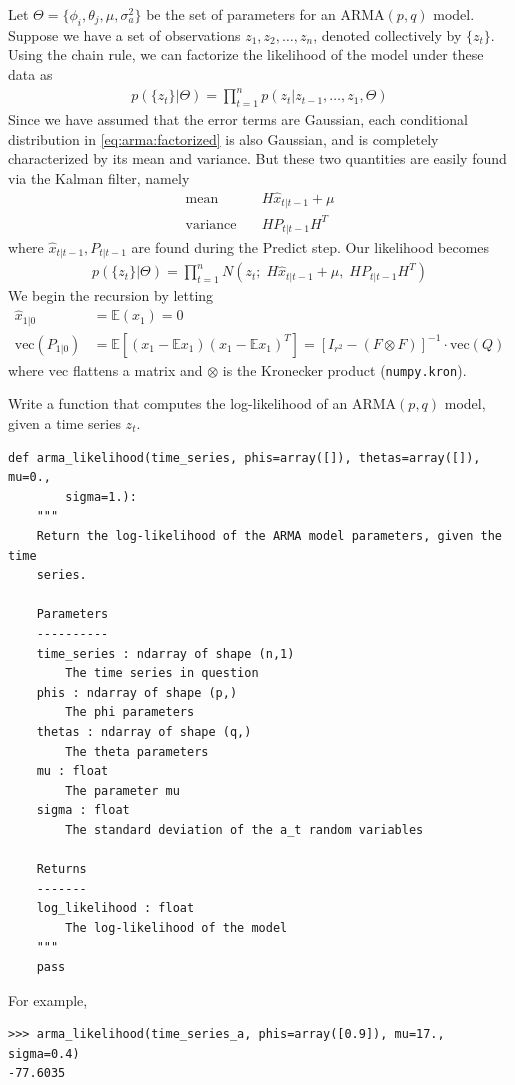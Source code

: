 Let $\Theta = \{\phi_i, \theta_j, \mu, \sigma_a^2\}$ be the set of parameters
for an $\text{ARMA}(p,q)$ model. 
Suppose we have a set of observations $z_1,z_2,\ldots,z_n$, denoted
collectively by $\{z_t\}$.
Using the chain rule, we can factorize the
likelihood of the model under these data as
\begin{align}
    \label{eq:arma:factorized}
    p(\{z_t\} | \Theta) = \prod_{t=1}^{n} p(z_t | z_{t-1}, \ldots, z_{1},
    \Theta)
\end{align}
Since we have assumed that the error terms are Gaussian, each conditional
distribution in \ref{eq:arma:factorized} is also Gaussian, and is completely
characterized by its mean and variance. But these two quantities are easily
found via the Kalman filter, namely
\begin{align}
    \text{mean} & \quad H\hat{x}_{t|t-1} + \mu \\
    \text{variance} & \quad HP_{t|t-1}H^T
\end{align}
where $\hat{x}_{t|t-1}, P_{t|t-1}$ are found during the Predict step. Our
likelihood becomes
\begin{align}
    \label{eq:arma:likelihood}
    p(\{z_t\} | \Theta) = \prod_{t=1}^{n} N(z_t;\; H\hat{x}_{t|t-1} + \mu,\;
    HP_{t|t-1}H^T)
\end{align}
We begin the recursion by letting
\begin{align}
    \hat{x}_{1|0} &= \mathbb{E}(x_1) = 0 \\
    \text{vec}(P_{1|0}) &= \mathbb{E}\left[(x_1 - \mathbb{E}x_1)(x_1 -
    \mathbb{E}x_1)^T\right] = \left[I_{r^2} - (F \otimes F)\right]^{-1} \cdot
    \text{vec}(Q)
\end{align}
where $\text{vec}$ flattens a matrix and $\otimes$ is the Kronecker product
({\tt numpy.kron}).

\begin{problem}
\label{prob:arma:likelihood}
Write a function that computes the log-likelihood of an $\text{ARMA}(p,q)$
model, given a time series $z_t$.

\begin{lstlisting}
def arma_likelihood(time_series, phis=array([]), thetas=array([]), mu=0.,
        sigma=1.):
    """
    Return the log-likelihood of the ARMA model parameters, given the time
    series.

    Parameters
    ----------
    time_series : ndarray of shape (n,1)
        The time series in question
    phis : ndarray of shape (p,)
        The phi parameters
    thetas : ndarray of shape (q,)
        The theta parameters
    mu : float
        The parameter mu
    sigma : float
        The standard deviation of the a_t random variables

    Returns
    -------
    log_likelihood : float
        The log-likelihood of the model
    """
    pass
\end{lstlisting}

\vspace{3mm} \noindent
For example,
\begin{lstlisting}
>>> arma_likelihood(time_series_a, phis=array([0.9]), mu=17., sigma=0.4)
-77.6035
\end{lstlisting}
\end{problem}

